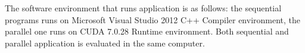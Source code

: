The software environment that runs application is as follows: the sequential
programs runs on Microsoft Visual Studio 2012 C++ Compiler environment, the
parallel one runs on CUDA 7.0.28 Runtime environment. Both sequential and
parallel application is evaluated in the same computer.

\vspace{-6mm}
\begin{figure}[!ht]
  \centering
  \begin{minipage}{0.29\textwidth}
    \centering
\end{minipage}
\end{figure}
